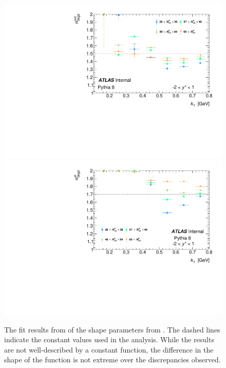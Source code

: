 \begin{figure}[t]
\begin{minipage}[t]{1.0\textwidth}
\centering
\includegraphics[width=.49\linewidth]{canqosl_backAlphaOut_vs_kt.pdf}
\includegraphics[width=.49\linewidth]{canqosl_backAlpha_vs_kt.pdf}\\
\end{minipage}
\caption{The fit results from  of the shape parameters from . The dashed lines indicate the constant values used in the analysis. While the results are not well-described by a constant function, the difference in the shape of the function is not extreme over the discrepancies observed.}
\label{fig:pythia_bkgd_alpha}
\end{figure}



